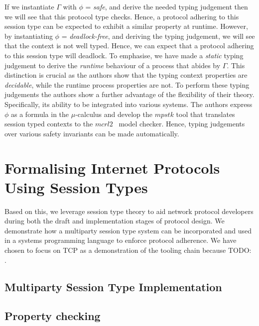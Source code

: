 \documentclass{article}
\newcommand{\todo}[1]{}
\renewcommand{\todo}[1]{{\color{red} TODO: {#1}}}
\newcommand{\type}[1]{\texttt{#1}}
\begin{document}
If we instantiate \type{\ensuremath{\Gamma}} with \type{\ensuremath{\phi}} = \textit{safe}, and derive the needed typing judgement then we will see that this protocol type checks.
Hence, a protocol adhering to this session type can be expected to exhibit a similar property at runtime. 
However, by instantiating \type{\ensuremath{\phi}} = \textit{deadlock-free}, and deriving the typing judgement, we will see that the context is not well typed.
Hence, we can expect that a protocol adhering to this session type will deadlock.
To emphasise, we have made a \textit{static} typing judgement to derive the \textit{runtime} behaviour of a process that abides by \type{\ensuremath{\Gamma}}.
This distinction is crucial as the authors show that the typing context properties are \textit{decidable}, while the runtime process properties are not.
To perform these typing judgements the authors show a further advantage of the flexibility of their theory.
Specifically, its ability to be integrated into various systems.
The authors express \type{\ensuremath{\phi}} as a formula in the \type{\ensuremath{\mu}}-calculus and develop the \ensuremath{mpstk} tool that translates session typed contexts to the \ensuremath{mcrl2}~\cite{BGKLNVWWW19} model checker.
Hence, typing judgements over various safety invariants can be made automatically.

\section{Formalising Internet Protocols Using Session Types}

Based on this, we leverage session type theory to aid network protocol developers during both the draft and implementation stages of protocol design.
We demonstrate how a multiparty session type system can be incorporated and used in a systems programming language to enforce protocol adherence.
We have chosen to focus on TCP as a demonstration of the tooling chain because \todo.

\subsection{Multiparty Session Type Implementation}

\subsection{Property checking}
\end{document}
